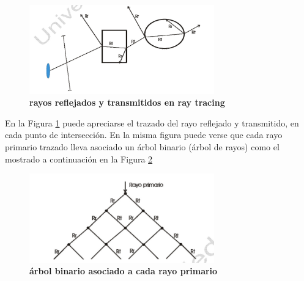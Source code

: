 \begin{figure}[h]
    \includegraphics[width=8cm]{Img/CPD/grafica10.jpg}
    \centering
    \caption{\textbf{\footnotesize{ rayos reflejados y transmitidos en ray tracing  }}}
    \label{fig:grafica10}
\end{figure}

En la Figura \ref{fig:grafica10} puede apreciarse el trazado del rayo reflejado y transmitido, en cada punto de intersección. En la misma figura puede verse que cada rayo primario trazado lleva asociado un árbol binario (árbol de rayos) como el mostrado a continuación en la Figura \ref{fig:grafica11}

\begin{figure}[h]
    \includegraphics[width=8cm]{Img/CPD/grafica11.jpg}
    \centering
    \caption{\textbf{\footnotesize{  árbol binario asociado a cada rayo primario  }}}
    \label{fig:grafica11}
\end{figure}


